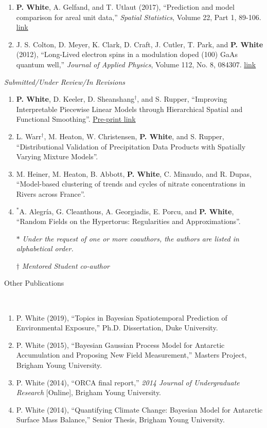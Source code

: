 \documentclass[11pt]{article}
\newcommand{\head}[1]{ %
    \bigskip %
    \begin{large}\begin{bf}{#1}\end{bf}\end{large} %

    \ \\ [-1.3cm] %

    \hrulefill}
\begin{document}
\begin{enumerate}[label=$\bullet$]
\item \textbf{P. White}, A. Gelfand, and T. Utlaut (2017), ``Prediction and model comparison for areal unit data,'' \emph{Spatial Statistics}, Volume 22, Part 1, 89-106. \href{http://www.sciencedirect.com/science/article/pii/S2211675317301422}{link}
\item J. S. Colton, D. Meyer, K. Clark, D. Craft, J. Cutler, T. Park, and \textbf{P. White} (2012), ``Long-Lived electron spins in a modulation doped (100) GaAs quantum well,'' \emph{Journal of Applied Physics}, Volume 112, No. 8, 084307.  \href{http://aip.scitation.org/doi/abs/10.1063/1.4759320}{link}
\end{enumerate}

\emph{Submitted/Under Review/In Revisions}

\begin{enumerate}[label=$\bullet$]
\item \textbf{P. White}, D. Keeler, D. Sheanshang$^\dagger$, and S. Rupper, ``Improving Interpretable Piecewise Linear Models through Hierarchical Spatial and Functional Smoothing''. \href{https://arxiv.org/abs/2006.09329}{Pre-print link}

\item L. Warr$^\dagger$, M. Heaton, W. Christensen, \textbf{P. White}, and S. Rupper, ``Distributional Validation of Precipitation Data Products with Spatially Varying Mixture Models''.

\item M. Heiner, M. Heaton, B. Abbott, \textbf{P. White}, C. Minaudo, and R. Dupas, ``Model-based clustering of trends and cycles of nitrate concentrations in Rivers across France''.

\item $^*$A. Alegr\'ia, G. Cleanthous, A. Georgiadis, E. Porcu, and \textbf{P. White}, ``Random Fields on the Hypertorus: Regularities and Approximations''. 
\setlength\itemsep{-1em} \\
\item[$*$] \textit{Under the request of one or more coauthors, the authors are listed in alphabetical order.}\\
\item[$\dagger$] \textit{Mentored Student co-author}
\end{enumerate}

\head{Other Publications}

\begin{enumerate}[label=$\bullet$]
\item P. White (2019), ``Topics in Bayesian Spatiotemporal Prediction of Environmental Exposure,'' Ph.D. Dissertation, Duke University.
\item P. White (2015), ``Bayesian Gaussian Process Model for Antarctic Accumulation and Proposing New Field Measurement,'' Masters Project, Brigham Young University.
\item P. White (2014), ``ORCA final report,'' \emph{2014 Journal of Undergraduate Research} [Online], Brigham Young University.
\item P. White (2014), ``Quantifying Climate Change: Bayesian Model for Antarctic Surface Mass Balance,'' Senior Thesis, Brigham Young University.
\end{enumerate}
\end{document}
